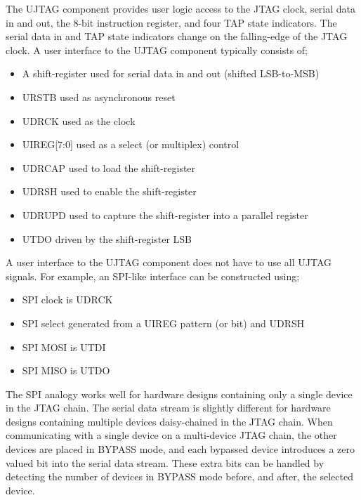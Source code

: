 The UJTAG component provides user logic access to the JTAG clock, serial data
in and out, the 8-bit instruction register, and four TAP state indicators.
The serial data in and TAP state indicators change on the falling-edge of
the JTAG clock.
%
A user interface to the UJTAG component typically consists of;
%
\begin{itemize}
\item A shift-register used for serial data in and out (shifted LSB-to-MSB)
\item URSTB used as asynchronous reset
\item UDRCK used as the clock
\item UIREG[7:0] used as a select (or multiplex) control
\item UDRCAP used to load the shift-register
\item UDRSH used to enable the shift-register
\item UDRUPD used to capture the shift-register into a parallel register
\item UTDO driven by the shift-register LSB
\end{itemize}
%
A user interface to the UJTAG component does not have to use all UJTAG signals.
For example, an SPI-like interface can be constructed using;
%
\begin{itemize}
\item SPI clock is UDRCK
\item SPI select generated from a UIREG pattern (or bit) and UDRSH
\item SPI MOSI is UTDI
\item SPI MISO is UTDO
\end{itemize}
%
The SPI analogy works well for hardware designs containing only a single
device in the JTAG chain. The serial data stream is slightly different
for hardware designs containing multiple devices daisy-chained in the JTAG chain.
When communicating with a single device on a multi-device JTAG chain, the other
devices are placed in BYPASS mode, and each bypassed device introduces a
zero valued bit into the serial data stream. These extra bits can be handled
by detecting the number of devices in BYPASS mode before, and after, the
selected device.


